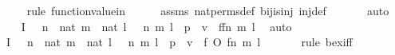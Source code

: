 \begin{isabellebody}
\ \ \ \ \isamarkupfalse%
{\isacharparenleft}{\kern0pt}rule\ function{\isacharunderscore}{\kern0pt}value{\isacharunderscore}{\kern0pt}in{\isacharparenright}{\kern0pt}\isanewline
\ \ \ \ \isamarkupfalse%
\ assms\ nat{\isacharunderscore}{\kern0pt}perms{\isacharunderscore}{\kern0pt}def\ bij{\isacharunderscore}{\kern0pt}is{\isacharunderscore}{\kern0pt}inj\ inj{\isacharunderscore}{\kern0pt}def\ \isanewline
\ \ \ \ \isamarkupfalse%
\ auto\isanewline
\ \ \isamarkupfalse%
\ I{}{\isacharcolon}{\kern0pt}\ {\isachardoublequoteopen}{\isachardot}{\kern0pt}{\isachardot}{\kern0pt}{\isachardot}{\kern0pt}\ {\isasymlongleftrightarrow}\ {\isacharparenleft}{\kern0pt}{\isasymexists}n\ {\isasymin}\ nat{\isachardot}{\kern0pt}\ {\isasymexists}m\ {\isasymin}\ nat{\isachardot}{\kern0pt}\ {\isasymexists}l\ {\isasymin}\ {}{\isachardot}{\kern0pt}\ {\isacharless}{\kern0pt}{\isacharless}{\kern0pt}n{\isacharcomma}{\kern0pt}\ m{\isachargreater}{\kern0pt}{\isacharcomma}{\kern0pt}\ l{\isachargreater}{\kern0pt}\ {\isasymin}\ p\ {\isasymand}\ v\ {\isacharequal}{\kern0pt}\ {\isacharless}{\kern0pt}{\isacharless}{\kern0pt}f{\isacharprime}{\kern0pt}{\isacharbackquote}{\kern0pt}{\isacharparenleft}{\kern0pt}f{\isacharbackquote}{\kern0pt}n{\isacharparenright}{\kern0pt}{\isacharcomma}{\kern0pt}\ m{\isachargreater}{\kern0pt}{\isacharcomma}{\kern0pt}\ l{\isachargreater}{\kern0pt}{\isacharparenright}{\kern0pt}{\isachardoublequoteclose}\ \isamarkupfalse%
\ auto\isanewline
\ \ \isamarkupfalse%
\ I{}{\isacharcolon}{\kern0pt}\ {\isachardoublequoteopen}{\isachardot}{\kern0pt}{\isachardot}{\kern0pt}{\isachardot}{\kern0pt}\ {\isasymlongleftrightarrow}\ {\isacharparenleft}{\kern0pt}{\isasymexists}n\ {\isasymin}\ nat{\isachardot}{\kern0pt}\ {\isasymexists}m\ {\isasymin}\ nat{\isachardot}{\kern0pt}\ {\isasymexists}l\ {\isasymin}\ {}{\isachardot}{\kern0pt}\ {\isacharless}{\kern0pt}{\isacharless}{\kern0pt}n{\isacharcomma}{\kern0pt}\ m{\isachargreater}{\kern0pt}{\isacharcomma}{\kern0pt}\ l{\isachargreater}{\kern0pt}\ {\isasymin}\ p\ {\isasymand}\ v\ {\isacharequal}{\kern0pt}\ {\isacharless}{\kern0pt}{\isacharless}{\kern0pt}{\isacharparenleft}{\kern0pt}f{\isacharprime}{\kern0pt}\ O\ f{\isacharparenright}{\kern0pt}{\isacharbackquote}{\kern0pt}n{\isacharcomma}{\kern0pt}\ m{\isachargreater}{\kern0pt}{\isacharcomma}{\kern0pt}\ l{\isachargreater}{\kern0pt}{\isacharparenright}{\kern0pt}{\isachardoublequoteclose}\ \ \isanewline
\ \ \ \ \isamarkupfalse%
{\isacharparenleft}{\kern0pt}rule\ bex{\isacharunderscore}{\kern0pt}iff{\isacharparenright}{\kern0pt}{\isacharplus}{\kern0pt}\isanewline

\end{isabellebody}
